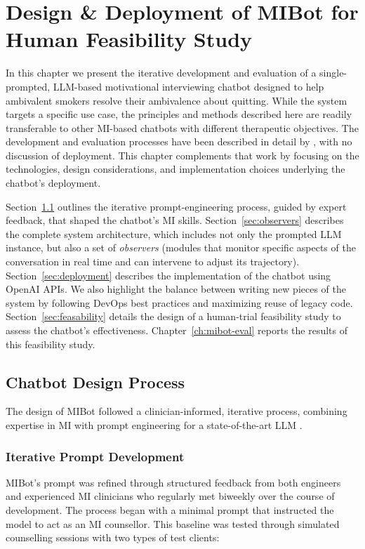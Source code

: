 \chapter{Design \& Deployment of MIBot for Human Feasibility Study}
\label{ch:mibot}

In this chapter we present the iterative development and evaluation of a single-prompted, LLM-based motivational interviewing chatbot designed to help ambivalent smokers resolve their ambivalence about quitting. While the system targets a specific use case, the principles and methods described here are readily transferable to other MI-based chatbots with different therapeutic objectives. The development and evaluation processes have been described in detail by \citet{mahmood-etal-2025-fully}, with no discussion of deployment. This chapter complements that work by focusing on the technologies, design considerations, and implementation choices underlying the chatbot's deployment.

Section~\ref{sec:iterative-development} outlines the iterative prompt-engineering process, guided by expert feedback, that shaped the chatbot's MI skills. Section~\ref{sec:observers} describes the complete system architecture, which includes not only the prompted LLM instance, but also a set of \textit{observers} (modules that monitor specific aspects of the conversation in real time and can intervene to adjust its trajectory). Section~\ref{sec:deployment} describes the implementation of the chatbot using OpenAI APIs. We also highlight the balance between writing new pieces of the system by following DevOps best practices and maximizing reuse of legacy code. Section~\ref{sec:feasability} details the design of a human-trial feasibility study to assess the chatbot's effectiveness.  Chapter~\ref{ch:mibot-eval} reports the results of this feasibility study.




\section{Chatbot Design Process}
\label{sec:iterative-development}

The design of MIBot followed a clinician-informed, iterative process, combining expertise in MI with prompt engineering for a state-of-the-art LLM \cite{openai2024gpt4ocard}. 


\subsection{Iterative Prompt Development}
MIBot's prompt was refined through structured feedback from both engineers and experienced MI clinicians who regularly met biweekly over the course of development. The process began with a minimal prompt that instructed the model to act as an MI counsellor. This baseline was tested through simulated counselling sessions with two types of test clients:

